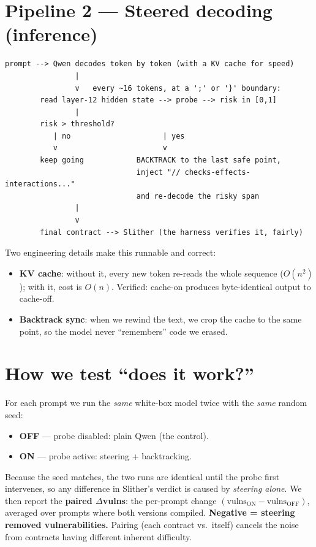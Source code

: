 \documentclass[11pt]{article}
\begin{document}
\section{Pipeline 2 --- Steered decoding (inference)}
\begin{Verbatim}[frame=single,fontsize=\small]
 prompt --> Qwen decodes token by token (with a KV cache for speed)
                |
                v   every ~16 tokens, at a ';' or '}' boundary:
        read layer-12 hidden state --> probe --> risk in [0,1]
                |
        risk > threshold?
           | no                     | yes
           v                        v
        keep going            BACKTRACK to the last safe point,
                              inject "// checks-effects-interactions..."
                              and re-decode the risky span
                |
                v
        final contract --> Slither (the harness verifies it, fairly)
\end{Verbatim}

\noindent Two engineering details make this runnable and correct:
\begin{itemize}[nosep]
  \item \textbf{KV cache}: without it, every new token re-reads the whole
  sequence ($O(n^2)$); with it, cost is $O(n)$. Verified: cache-on produces
  byte-identical output to cache-off.
  \item \textbf{Backtrack sync}: when we rewind the text, we crop the cache to
  the same point, so the model never ``remembers'' code we erased.
\end{itemize}

\section{How we test ``does it work?''}
For each prompt we run the \emph{same} white-box model twice with the \emph{same}
random seed:
\begin{itemize}[nosep]
  \item \textbf{OFF} --- probe disabled: plain Qwen (the control).
  \item \textbf{ON} --- probe active: steering + backtracking.
\end{itemize}
Because the seed matches, the two runs are identical until the probe first
intervenes, so any difference in Slither's verdict is caused by \emph{steering
alone}. We then report the \textbf{paired $\Delta$vulns}: the per-prompt change
$(\text{vulns}_{\text{ON}} - \text{vulns}_{\text{OFF}})$, averaged over prompts
where both versions compiled. \textbf{Negative = steering removed
vulnerabilities.} Pairing (each contract vs.\ itself) cancels the noise from
contracts having different inherent difficulty.
\end{document}
